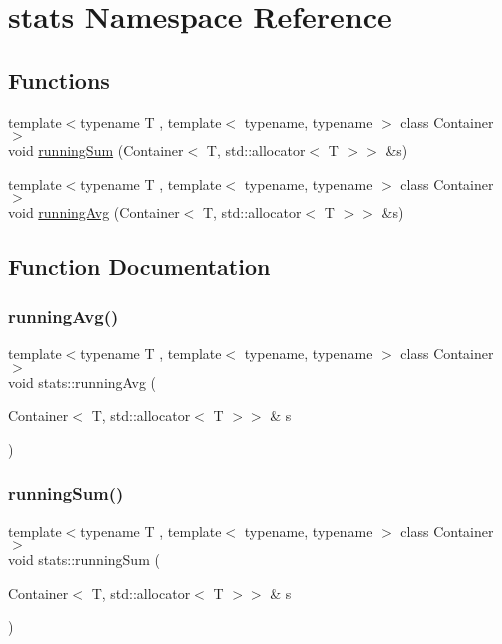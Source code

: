\hypertarget{namespacestats}{}\section{stats Namespace Reference}
\label{namespacestats}
\subsection*{Functions}
\begin{DoxyCompactItemize}
\item 
{\footnotesize template$<$typename T , template$<$ typename, typename $>$ class Container$>$ }\\void \mbox{\hyperlink{namespacestats_ad41dcc4739131e62e357a336b4340c83}{running\+Sum}} (Container$<$ T, std\+::allocator$<$ T $>$$>$ \&s)
\item 
{\footnotesize template$<$typename T , template$<$ typename, typename $>$ class Container$>$ }\\void \mbox{\hyperlink{namespacestats_a5928c23b9498b3b011270820685c6570}{running\+Avg}} (Container$<$ T, std\+::allocator$<$ T $>$$>$ \&s)
\end{DoxyCompactItemize}


\subsection{Function Documentation}
\mbox{\label{namespacestats_a5928c23b9498b3b011270820685c6570}} 
\subsubsection{\texorpdfstring{runningAvg()}{runningAvg()}}
{\footnotesize\ttfamily template$<$typename T , template$<$ typename, typename $>$ class Container$>$ \\
void stats\+::running\+Avg (\begin{DoxyParamCaption}\item[{Container$<$ T, std\+::allocator$<$ T $>$$>$ \&}]{s }\end{DoxyParamCaption})\hspace{0.3cm}{\ttfamily [inline]}}

\mbox{\label{namespacestats_ad41dcc4739131e62e357a336b4340c83}} 
\subsubsection{\texorpdfstring{runningSum()}{runningSum()}}
{\footnotesize\ttfamily template$<$typename T , template$<$ typename, typename $>$ class Container$>$ \\
void stats\+::running\+Sum (\begin{DoxyParamCaption}\item[{Container$<$ T, std\+::allocator$<$ T $>$$>$ \&}]{s }\end{DoxyParamCaption})\hspace{0.3cm}{\ttfamily [inline]}}

